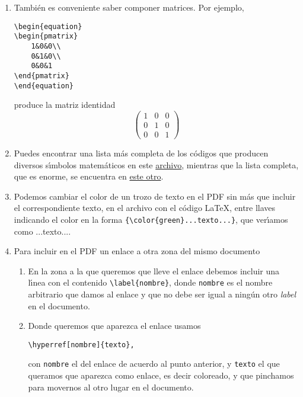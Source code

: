 \begin{appendices}
\begin{enumerate}
\begin{enumerate}
\end{enumerate}
\item Tambi\'en es conveniente saber componer matrices. Por ejemplo, 

\begin{lstlisting}[language={[LaTeX]TeX}]
\begin{equation}
\begin{pmatrix}
    1&0&0\\
    0&1&0\\
    0&0&1
\end{pmatrix}
\end{equation}
\end{lstlisting}
\noindent produce la matriz identidad 
\begin{equation}
\begin{pmatrix}
    1&0&0\\
    0&1&0\\
    0&0&1
\end{pmatrix}
\end{equation}
\item Puedes encontrar una lista m\'as completa de los c\'odigos que producen
diversos s\'{\i}mbolos matem\'aticos en este
\href{http://150.244.21.37/PDFs/INTRO/short-math-guide.pdf}{archivo}, mientras que la lista
completa, que es enorme, se encuentra en
\href{http://150.244.21.37/PDFs/INTRO/symbols-a4.pdf}{este otro}.
\item Podemos cambiar el color de un trozo de texto en el PDF sin m\'as que
incluir el correspondiente texto, en el archivo con el c\'odigo \LaTeX,  entre
llaves indicando el color en la forma
{\tt\lstinline[language={[LaTeX]TeX}]|{\color{green}...texto...}|}, %
que ver\'{\i}amos como {\color{green}...texto...}. 



\item Para incluir en el PDF un enlace a otra zona del mismo documento 
\begin{enumerate}
 \item En la zona a la que queremos que lleve el enlace debemos incluir una
l\'{\i}nea con el contenido 
 \verb=\label{nombre}=, donde {\tt nombre} es el nombre arbitrario que damos al
enlace y que no debe ser igual a ning\'un otro  {\itshape label} en el
documento.
 \item Donde queremos que aparezca el enlace usamos
\begin{center}
\verb|\hyperref[nombre]{texto},|
\end{center}
\noindent con {\tt nombre} el del enlace de acuerdo al
punto
anterior, y {\tt texto} el que queramos que aparezca como enlace, es decir
coloreado, y que pinchamos para movernos al otro lugar en el documento.
 \end{enumerate}


\end{enumerate}
\end{appendices}
